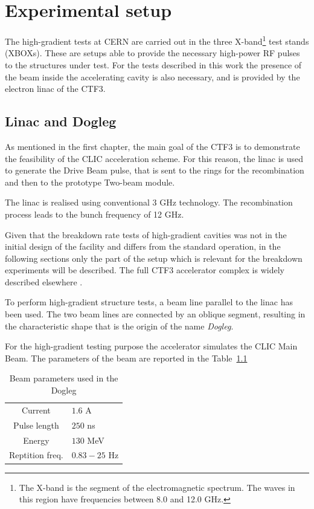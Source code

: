 \chapter[Experimental setup]{Experimental setup}
\label{chap:setup}

The high-gradient tests at CERN are carried out in the three X-band\footnote{The X-band is the segment of the electromagnetic spectrum. The waves in this region have frequencies between 8.0 and 12.0 GHz.} test stands (XBOXs). These are setups able to provide the necessary high-power RF pulses to the structures under test. For the tests described in this work the presence of the beam inside the accelerating cavity is also necessary, and is provided by the electron linac of the CTF3. 


\section[Linac and dogleg]{Linac and Dogleg}

As mentioned in the first chapter, the main goal of the CTF3 is to demonstrate the feasibility of the CLIC acceleration scheme. For this reason, the linac is used to generate the Drive Beam pulse, that is sent to the rings for the recombination and then to the prototype Two-beam module. 

The linac is realised using conventional 3 GHz technology. The recombination process leads to the bunch frequency of 12 GHz. 

Given that the breakdown rate tests of high-gradient cavities was not in the initial design of the facility and differs from the standard operation, in the following sections only the part of the setup which is relevant for the breakdown experiments will be described. The full CTF3 accelerator complex is widely described elsewhere \cite{CLIC:cdr,CTF:drive_beam,ctf3:dr}. 

To perform high-gradient structure tests, a beam line parallel to the linac has been used. The two beam lines are connected by an oblique segment, resulting in the characteristic shape that is the origin of the name \textit{Dogleg}.

For the high-gradient testing purpose the accelerator  simulates the CLIC Main Beam. The parameters of the beam are reported in the Table~\ref{beam_par_dogleg}


\begin{table}
  \centering
    \begin{tabular}{ c l }
    \hline
    \hline
    Current 		&	$1.6$ A\\
    Pulse length		&	$250$ ns\\
    Energy			&	$130$ MeV\\
    Reptition freq.	&	$0.83-25$ Hz\\
    \hline
    \hline
    \end{tabular}
\caption{Beam parameters used in the Dogleg \cite{NavarroQuirante:2025954}}
\label{beam_par_dogleg}
\end{table}



